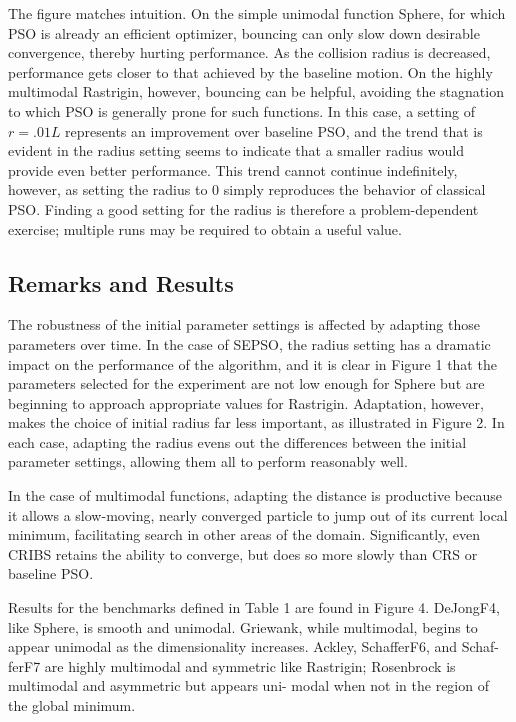 \documentclass[pdftex,11pt]{article}
\begin{document}
The figure matches intuition. On the simple unimodal function Sphere, for which PSO is already an efficient optimizer, bouncing can only slow down desirable convergence, thereby hurting performance. As the collision radius is decreased, performance gets closer to that achieved by the baseline motion. On the highly multimodal Rastrigin, however, bouncing can be helpful, avoiding the stagnation to which PSO is generally prone for such functions. In this case, a setting of $r = .01L$ represents an improvement over baseline PSO, and the trend that is evident in the radius setting seems to indicate that a smaller radius would provide even better performance. This trend cannot continue indefinitely, however, as setting the radius to 0 simply reproduces the behavior of classical PSO. Finding a good setting for the radius is therefore a problem-dependent exercise; multiple runs may be required to obtain a useful value.

\subsection{Remarks and Results}
The robustness of the initial parameter settings is affected by adapting those parameters over time. In the case of SEPSO, the radius setting has a dramatic impact on the performance of the algorithm, and it is clear in Figure 1 that the parameters selected for the experiment are not low enough for Sphere but are beginning to approach appropriate values for Rastrigin. Adaptation, however, makes the choice of initial radius far less important, as illustrated in Figure 2. In each case, adapting the radius evens out the differences between the initial parameter settings, allowing them all to perform reasonably well.

In the case of multimodal functions, adapting the distance is productive because it allows a slow-moving, nearly converged particle to jump out of its current local minimum, facilitating search in other areas of the domain. Significantly, even CRIBS retains the ability to converge, but does so more slowly than CRS or baseline PSO. 

Results for the benchmarks defined in Table 1 are found in Figure 4. DeJongF4, like Sphere, is smooth and unimodal. Griewank, while multimodal, begins to appear unimodal as the dimensionality increases. Ackley, SchafferF6, and Schaf- ferF7 are highly multimodal and symmetric like Rastrigin; Rosenbrock is multimodal and asymmetric but appears uni- modal when not in the region of the global minimum. 
\end{document}
